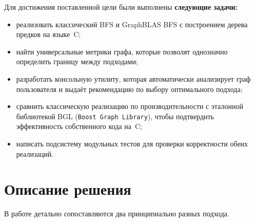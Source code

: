\documentclass[a4paper]{article}
\begin{document}
Для достижения поставленной цели были выполнены \textbf{следующие задачи:}

\begin{itemize}
    \item реализовать классический BFS и GraphBLAS BFS с построением дерева предков на языке~C;
    \item найти универсальные метрики графа, которые позволят однозначно определить границу между подходами;
    \item разработать консольную утилиту, которая автоматически анализирует граф пользователя и выдаёт рекомендацию по выбору оптимального подхода;
    \item сравнить классическую реализацию по производительности с эталонной библиотекой BGL (\texttt{Boost Graph Library}), чтобы подтвердить эффективность собственного кода на~C;
    \item написать подсистему модульных тестов для проверки корректности обеих реализаций.
\end{itemize}

\section{Описание решения}

В работе детально сопоставляются два принципиально разных подхода.
\end{document}
